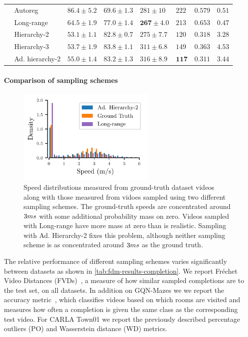 \begin{table}
\begin{tabular}{llllllll}
    &  Autoreg        & $86.4 \pm 5.2$          & $69.6 \pm 1.3$   & $281 \pm 10$          & $222$          & $0.579$      & $0.51$     \\
    &  Long-range           & $64.5\pm1.9$            & $77.0 \pm 1.4$   & $\mathbf{267 \pm 4.0}$     & $213$          & $0.653$      & $\mathbf{0.47}$     \\
    &  Hierarchy-2          & $\mathbf{53.1 \pm 1.1}$ & $82.8 \pm 0.7$   & $275 \pm 7.7$        & $120$     & $0.318$  &  $3.28$      \\
    &  Hierarchy-3          & $53.7 \pm 1.9$          & $\mathbf{83.8 \pm 1.1}$   & $311 \pm 6.8$        & $149$      & $0.363$    &  $4.53$  \\
    &  Ad. hierarchy-2      & $55.0 \pm 1.4$          & $83.2 \pm 1.3$   & $316 \pm 8.9$    & $\mathbf{117}$          & $\mathbf{0.311}$     & $3.44$    \\
    \bottomrule
  \end{tabular}
\end{table}

\paragraph{Comparison of sampling schemes}
\begin{figure}
    \centering
    \includegraphics[width=0.6\textwidth]{figs/fdm/hist_new.pdf}
    \caption{Speed distributions measured from ground-truth dataset videos along with those measured from vidoes sampled using two different sampling schemes. The ground-truth speeds are concentrated around $3m\/s$ with some additional probability mass on zero. Videos sampled with Long-range have more mass at zero than is realistic. Sampling with Ad. Hierarchy-2 fixes this problem, although neither sampling scheme is as concentrated around $3m\/s$ as the ground truth.}
    \label{fig:hist}
\end{figure}
The relative performance of different sampling schemes varies significantly between datasets as shown in \cref{tab:fdm-results-completion}. We report Fréchet Video Distances (FVDs)~\cite{unterthiner2018towards}, a measure of how similar sampled completions are to the test set, on all datasets. In addition on GQN-Mazes we we report the accuracy metric~\cite{saxena2021clockwork}, which classifies videos based on which rooms are visited and measures how often a completion is given the same class as the corresponding test video. For CARLA Town01 we report the previously described percentage outliers (PO) and Wasserstein distance (WD) metrics. 

